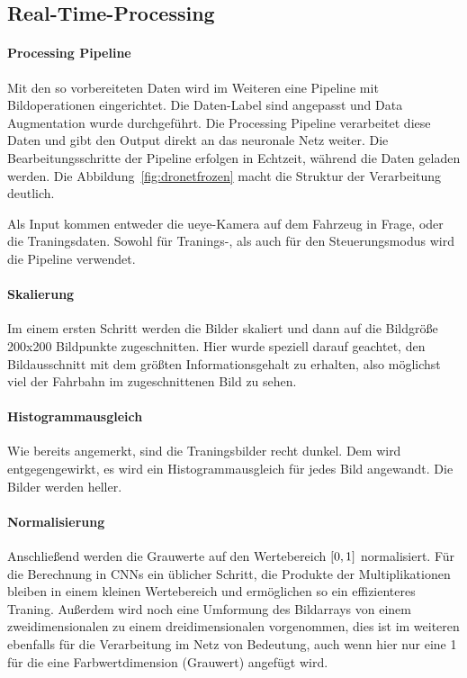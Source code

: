 \subsection{Real-Time-Processing}
\paragraph{Processing Pipeline}
Mit den so vorbereiteten Daten wird im Weiteren eine Pipeline mit Bildoperationen eingerichtet. Die Daten-Label sind angepasst und Data Augmentation wurde durchgeführt. Die Processing Pipeline verarbeitet diese Daten und gibt den Output direkt an das neuronale Netz weiter. Die Bearbeitungsschritte der Pipeline erfolgen in Echtzeit, während die Daten geladen werden. Die Abbildung~\ref{fig:dronetfrozen} macht die Struktur der Verarbeitung deutlich. 

Als Input kommen entweder die ueye-Kamera auf dem Fahrzeug in Frage, oder die Traningsdaten. Sowohl für Tranings-, als auch für den Steuerungsmodus wird die Pipeline verwendet. 

\paragraph{Skalierung}
Im einem ersten Schritt werden die Bilder skaliert und dann auf die Bildgröße 200x200 Bildpunkte zugeschnitten. Hier wurde speziell darauf geachtet, den Bildausschnitt mit dem größten Informationsgehalt zu erhalten, also möglichst viel der Fahrbahn im zugeschnittenen Bild zu sehen.

\paragraph{Histogrammausgleich}
Wie bereits angemerkt, sind die Traningsbilder recht dunkel. Dem wird entgegengewirkt, es wird ein Histogrammausgleich für jedes Bild angewandt. Die Bilder werden heller.

\paragraph{Normalisierung}
Anschließend werden die Grauwerte auf den Wertebereich $\interval{0}{1}$ normalisiert. Für die Berechnung in CNNs ein üblicher Schritt, die Produkte der Multiplikationen bleiben in einem kleinen Wertebereich und ermöglichen so ein effizienteres Traning. Außerdem wird noch eine Umformung des Bildarrays von einem zweidimensionalen zu einem dreidimensionalen vorgenommen, dies ist im weiteren ebenfalls für die Verarbeitung im Netz von Bedeutung, auch wenn hier nur eine 1 für die eine Farbwertdimension (Grauwert) angefügt wird.

